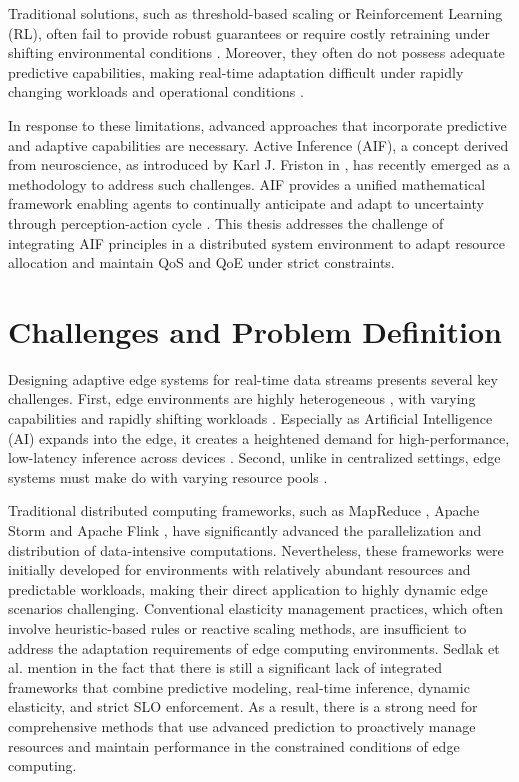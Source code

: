 Traditional solutions, such as threshold-based scaling or Reinforcement Learning (RL), often fail to provide robust guarantees or require costly retraining under shifting environmental conditions \cite{xu_coscal_2022}. Moreover, they often do not possess adequate predictive capabilities, making real-time adaptation difficult under rapidly changing workloads and operational conditions \cite{oquinn_environment-aware_2025}.

In response to these limitations, advanced approaches that incorporate predictive and adaptive
capabilities are necessary. Active Inference (AIF), a concept derived from neuroscience, as introduced by Karl J. Friston in \cite{friston_free-energy_2010}, has recently emerged as a methodology to address such challenges. AIF provides a unified mathematical framework enabling agents to
continually anticipate and adapt to uncertainty through perception-action cycle \cite{friston_active_2016, lanillos_active_2021}. This thesis addresses the challenge of integrating AIF principles in a distributed system environment to adapt resource allocation and maintain QoS and QoE under strict constraints.

\section{Challenges and Problem Definition}
Designing adaptive edge systems for real-time data streams presents several key
challenges. First, edge environments are highly heterogeneous \cite{furst_elastic_2018}, with varying capabilities and
rapidly shifting workloads \cite{danilenka_adaptive_2025}. Especially as Artificial Intelligence (AI) expands into the edge, it creates a heightened demand for high-performance, low-latency inference across devices \cite{oquinn_environment-aware_2025}. Second, unlike in centralized settings, edge systems must make do with varying resource pools \cite{sedlak_equilibrium_2024}.

Traditional distributed computing frameworks, such as MapReduce \cite{dean_mapreduce_2008},
Apache Storm\cite{noauthor_apache_nodate} and Apache Flink \cite{noauthor_apache_nodate-1, carbone_apache_2015}, have significantly advanced the parallelization and
distribution of data-intensive computations. Nevertheless, these frameworks were initially
developed for environments with relatively abundant resources and predictable workloads,
making their direct application to highly dynamic edge scenarios challenging. Conventional elasticity management practices, which often involve heuristic-based rules or reactive scaling methods, are insufficient to address the adaptation requirements of edge computing environments. Sedlak et al. mention in \cite{sedlak_diffusing_2024} the fact that there is still a significant lack of integrated frameworks that combine predictive modeling, real-time inference, dynamic elasticity, and strict SLO enforcement. As a result, there is a strong need for comprehensive methods that use advanced prediction to proactively manage resources and maintain performance in the constrained conditions of edge computing.

